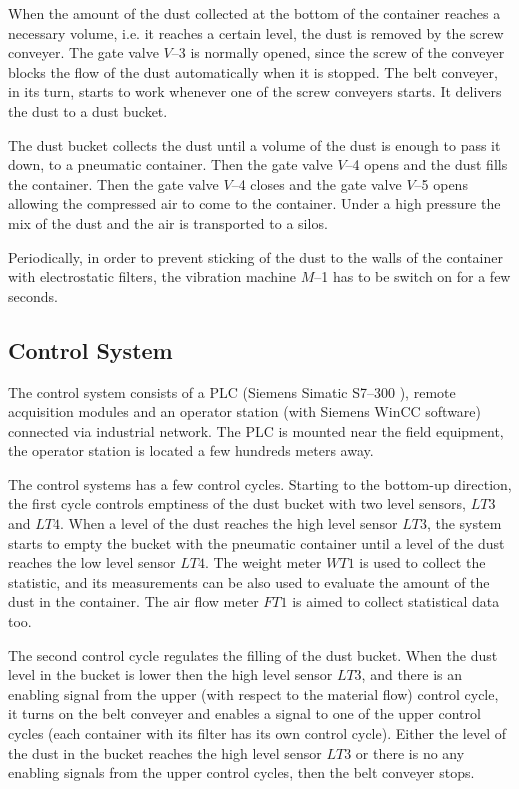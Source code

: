 When the amount of the dust collected at the bottom of the container reaches a
necessary volume, i.e. it reaches a certain level, the dust is removed by the
screw conveyer. The gate valve $V$--3 is normally opened, since the screw of the
conveyer blocks the flow of the dust automatically when it is stopped. The belt
conveyer, in its turn, starts to work whenever one of the screw conveyers
starts. It delivers the dust to a dust bucket.

The dust bucket collects the dust until a volume of the dust is enough to pass
it down, to a pneumatic container. Then the gate valve $V$--4 opens and the
dust fills the container. Then the gate valve $V$--4 closes and the gate valve
$V$--5 opens allowing the compressed air to come to the container. Under a high
pressure the mix of the dust and the air is transported to a silos.

Periodically, in order to prevent sticking of the dust to the walls of the
container with electrostatic filters, the vibration machine $M$--1 has to be
switch on for a few seconds.


\subsection{Control System}


The control system consists of a PLC (Siemens Simatic S7--300
\cite{simatic_s7_300}), remote acquisition modules and an operator station
(with Siemens WinCC software) connected via industrial network. The PLC is
mounted near the field equipment, the operator station is located a few hundreds
meters away. 

The control systems has a few control cycles. Starting to the bottom-up
direction, the first cycle controls emptiness of the dust bucket with two level
sensors, $LT3$ and $LT4$. When a level of the dust reaches the high level
sensor $LT3$, the system starts to empty the bucket with the pneumatic container
until a level of the dust reaches the low level sensor $LT4$. The weight meter
$WT1$ is used to collect the statistic, and its measurements can be also used to
evaluate the amount of the dust in the container. The air flow meter $FT1$ is
aimed to collect statistical data too.

The second control cycle regulates the filling of the dust bucket. When the
dust level in the bucket is lower then the high level sensor $LT3$, and there is
an enabling signal from the upper (with respect to the material flow) control
cycle, it turns on the belt conveyer and enables a signal to one of the upper
control cycles (each container with its filter has its own control cycle).
Either the level of the dust in the bucket reaches the high level sensor $LT3$
or there is no any enabling signals from the upper control cycles, then the belt
conveyer stops.

